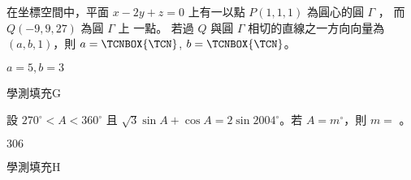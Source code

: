 \begin{QUESTIONS}
\begin{QUESTION}
\begin{QBODY}
            在坐標空間中，平面 $x-2y+z=0$ 上有一以點 $P(1,1,1)$ 為圓心的圓 $\Gamma$ ，
            而 $Q(-9,9, 27)$ 為圓 $\Gamma$ 上 一點。
            若過 $Q$ 與圓  $\Gamma$ 相切的直線之一方向向量為 $(a, b, 1)$，則 $a= 
            \TCNBOX{\TCN}$, $b= 
            \TCNBOX{\TCN}$。
        \end{QBODY}
        \begin{QFROMS}
        \end{QFROMS}
        \begin{QTAGS}\end{QTAGS}
        \begin{QANS}
            $a=5, b=3$
        \end{QANS}
        \begin{QSOLLIST}
        \end{QSOLLIST}
        \begin{QEMPTYSPACE}
        \end{QEMPTYSPACE}
    \end{QUESTION}
    \begin{QUESTION}
        \begin{ExamInfo}{93}{學測}{填充}{G}
        \end{ExamInfo}
        \begin{ExamAnsRateInfo}{10}{27}{3}{0}
        \end{ExamAnsRateInfo}
        \begin{QBODY}
            設 $270^\circ <A< 360^\circ$ 且 $\sqrt{3}\sin A+ \cos A=2 \sin {2004} ^\circ$。若 $A=m^\circ$，則 $m=$
            \TCNBOX{\TCN\TCN\TCN}。
        \end{QBODY}
        \begin{QFROMS}
        \end{QFROMS}
        \begin{QTAGS}\end{QTAGS}
        \begin{QANS}
            $306$
        \end{QANS}
        \begin{QSOLLIST}
        \end{QSOLLIST}
        \begin{QEMPTYSPACE}
        \end{QEMPTYSPACE}
    \end{QUESTION}
    \begin{QUESTION}
        \begin{ExamInfo}{93}{學測}{填充}{H}

\end{ExamInfo}
\end{QUESTION}
\end{QUESTIONS}
